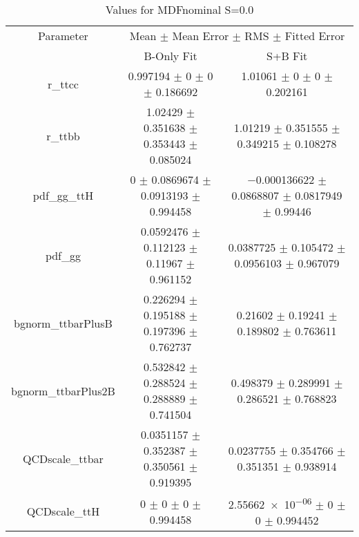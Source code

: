\begin{table}
\centering
\caption{Values for MDFnominal S=0.0}
\begin{tabular}{ccc}
\toprule
Parameter & \multicolumn{2}{c}{Mean $\pm$ Mean Error $\pm$ RMS $\pm$ Fitted Error}\\
 & B-Only Fit & S+B Fit\\
\midrule
r\_ttcc & \num{0.997194} $\pm$ \num{0} $\pm$ \num{0} $\pm$ \num{0.186692} & \num{1.01061} $\pm$ \num{0} $\pm$ \num{0} $\pm$ \num{0.202161}\\
r\_ttbb & \num{1.02429} $\pm$ \num{0.351638} $\pm$ \num{0.353443} $\pm$ \num{0.085024} & \num{1.01219} $\pm$ \num{0.351555} $\pm$ \num{0.349215} $\pm$ \num{0.108278}\\
pdf\_gg\_ttH & \num{0} $\pm$ \num{0.0869674} $\pm$ \num{0.0913193} $\pm$ \num{0.994458} & \num{-0.000136622} $\pm$ \num{0.0868807} $\pm$ \num{0.0817949} $\pm$ \num{0.99446}\\
pdf\_gg & \num{0.0592476} $\pm$ \num{0.112123} $\pm$ \num{0.11967} $\pm$ \num{0.961152} & \num{0.0387725} $\pm$ \num{0.105472} $\pm$ \num{0.0956103} $\pm$ \num{0.967079}\\
bgnorm\_ttbarPlusB & \num{0.226294} $\pm$ \num{0.195188} $\pm$ \num{0.197396} $\pm$ \num{0.762737} & \num{0.21602} $\pm$ \num{0.19241} $\pm$ \num{0.189802} $\pm$ \num{0.763611}\\
bgnorm\_ttbarPlus2B & \num{0.532842} $\pm$ \num{0.288524} $\pm$ \num{0.288889} $\pm$ \num{0.741504} & \num{0.498379} $\pm$ \num{0.289991} $\pm$ \num{0.286521} $\pm$ \num{0.768823}\\
QCDscale\_ttbar & \num{0.0351157} $\pm$ \num{0.352387} $\pm$ \num{0.350561} $\pm$ \num{0.919395} & \num{0.0237755} $\pm$ \num{0.354766} $\pm$ \num{0.351351} $\pm$ \num{0.938914}\\
QCDscale\_ttH & \num{0} $\pm$ \num{0} $\pm$ \num{0} $\pm$ \num{0.994458} & \num{2.55662e-06} $\pm$ \num{0} $\pm$ \num{0} $\pm$ \num{0.994452}\\
\bottomrule
\end{tabular}
\end{table}